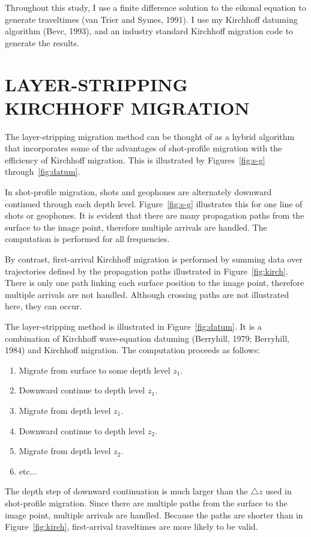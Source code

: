 Throughout this study, I use a finite difference solution to the 
eikonal equation to generate traveltimes (van Trier and Symes, 1991).
I use my Kirchhoff datuming
algorithm (Bevc, 1993), and an industry standard Kirchhoff
migration code to generate the results.

\section{LAYER-STRIPPING KIRCHHOFF MIGRATION}

The layer-stripping migration method can be thought of as a hybrid 
algorithm that incorporates some of the advantages of shot-profile
migration with the efficiency of Kirchhoff migration.
This is illustrated by Figures~\ref{fig:s-g} through~\ref{fig:datum}.

In shot-profile migration, shots and geophones are
alternately downward continued through each depth level.
Figure~\ref{fig:s-g} illustrates this for one line of shots or geophones.  
It is evident that there are many propagation paths from the surface
to the image point, therefore multiple arrivals are handled.
The computation is performed for all frequencies.

By contrast, first-arrival Kirchhoff migration is performed 
by summing data over trajectories defined by the propagation paths
illustrated in Figure~\ref{fig:kirch}. There is only one path linking
each surface position to the image point, therefore multiple arrivals are
not handled. Although crossing paths are not illustrated here, they can occur.

The layer-stripping method is illustrated in Figure~\ref{fig:datum}.
It is a combination of Kirchhoff wave-equation datuming 
(Berryhill, 1979; Berryhill, 1984) and Kirchhoff migration. 
The computation proceeds as follows:
\begin{enumerate}
	\item Migrate from surface to some depth level $z_1$.
	\item Downward continue to depth level $z_1$.
	\item Migrate from depth level $z_1$.
	\item Downward continue to depth level $z_2$.
	\item Migrate from depth level $z_2$.
	\item etc...
\end{enumerate}
The depth step of downward continuation is much larger than the
$\triangle z$ used in shot-profile migration. Since
there are multiple paths from the surface to the image point,
multiple arrivals are handled. Because the paths are shorter than
in Figure~\ref{fig:kirch}, first-arrival traveltimes are more likely to 
be valid.

